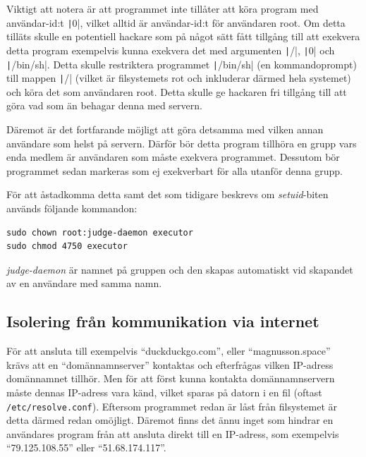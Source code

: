 \documentclass{article}
\begin{document}
Viktigt att notera är att programmet inte tillåter att köra program med
användar-id:t \texttt|0|, vilket alltid är användar-id:t
för användaren root. Om detta tilläts skulle en potentiell hackare som på något
sätt fått tillgång till att exekvera detta program exempelvis kunna exekvera det
med argumenten \texttt|/|,
\texttt|0| och \texttt|/bin/sh|.
Detta skulle restriktera programmet \texttt|/bin/sh| (en
kommandoprompt) till mappen \texttt|/| (vilket är
filsystemets rot och inkluderar därmed hela systemet) och köra det som
användaren root. Detta skulle ge hackaren fri tillgång till att göra vad som än
behagar denna med servern.

Däremot är det fortfarande möjligt att göra detsamma med vilken annan användare
som helst på servern. Därför bör detta program tillhöra en grupp vars enda
medlem är användaren som måste exekvera programmet. Dessutom bör programmet
sedan markeras som ej exekverbart för alla utanför denna grupp.

För att åstadkomma detta samt det som tidigare beskrevs om \textit{setuid}-biten
används följande kommandon:

\begin{verbatim}
sudo chown root:judge-daemon executor
sudo chmod 4750 executor
\end{verbatim}

\textit{judge-daemon} är namnet på gruppen och den skapas automatiskt vid
skapandet av en användare med samma namn.

\subsection{Isolering från kommunikation via internet}

För att ansluta till exempelvis ``duckduckgo.com'', eller ``magnusson.space'' \\
krävs att en ``domännamnserver'' kontaktas och efterfrågas vilken IP-adress
domännamnet tillhör.
Men för att först kunna kontakta domännamnservern måste dennas IP-adress vara
känd, vilket sparas på datorn i en fil (oftast \texttt{/etc/resolve.conf}).
Eftersom programmet redan är låst från filsystemet är detta därmed redan
omöjligt.
Däremot finns det ännu inget som hindrar en användares program från att ansluta
direkt till en IP-adress, som exempelvis ``79.125.108.55'' eller 
``51.68.174.117''.
\end{document}
